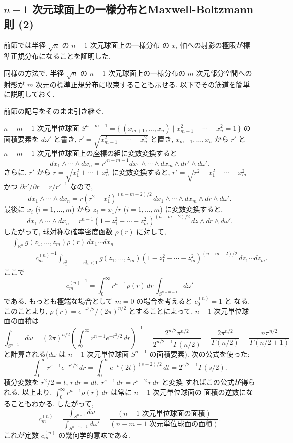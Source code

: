 \documentclass[12pt,twoside]{jarticle}
\newcommand\R{{\mathbb R}} %
\renewcommand\d{\partial}
\theoremstyle{jplain}
\theoremstyle{jplain}
\theoremstyle{jplain}
\numberwithin{theorem}{section}
\numberwithin{equation}{section}
\numberwithin{figure}{section}
\numberwithin{table}{section}
\begin{document}

\subsection{$n-1$ 次元球面上の一様分布とMaxwell-Boltzmann則 (2)}
\label{sec:MB2}

前節では半径 $\sqrt{n}$ の $n-1$ 次元球面上の一様分布
の $x_i$ 軸への射影の極限が標準正規分布になることを証明した.

同様の方法で, 
半径 $\sqrt{n}$ の $n-1$ 次元球面上の一様分布の
$m$ 次元部分空間への射影が $m$ 次元の標準正規分布に収束することも示せる.
以下でその筋道を簡単に説明しておく.

前節の記号をそのまま引き継ぐ.

$n-m-1$ 次元単位球面 $S^{n-m-1}=\{\,(x_{m+1},\ldots,x_n)\mid x_{m+1}^2+\cdots+x_n^2=1\,\}$ 
の面積要素を $d\omega'$ と書き, 
$r'=\sqrt{x_{m+1}^2+\cdots+x_n^2}$ と置き, 
$x_{m+1},\ldots,x_n$ から $r'$ と $n-m-1$ 次元単位球面上の座標の組に変数変換すると
\[
dx_1\wedge\cdots\wedge dx_n
=r'^{n-m-1}dx_1\wedge\cdots\wedge dx_m\wedge dr'\wedge d\omega'.
\]
さらに, $r'$ から $r=\sqrt{x_1^2+\cdots+x_n^2}$ に変数変換すると, 
$r'=\sqrt{r^2-x_1^2-\cdots-x_m^2}$ かつ $\d r'/\d r=r/r'^{-1}$ なので, 
\[
dx_1\wedge\cdots\wedge dx_n
=r(r^2-x_1^2)^{(n-m-2)/2}\,dx_1\wedge\cdots\wedge dx_m\wedge dr\wedge d\omega'.
\]
最後に $x_i$ ($i=1,\ldots,m$) から $z_i=x_1/r$ ($i=1,\ldots,m$) に変数変換すると, 
\[
dx_1\wedge\cdots\wedge dx_n
=r^{n-1}(1-z_1^2-\cdots-z_m^2)^{(n-m-2)/2}\,dz\wedge dr\wedge d\omega'.
\]
したがって, 球対称な確率密度函数 $\rho(r)$ に対して, 
\begin{align*}
&
\int_{\R^n} g(z_1,\ldots,z_m)\rho(r)\,dx_1\cdots dx_n
\\ & \qquad
={c^{(n)}_{m}}^{-1}
\int_{z_1^2+\cdots+z_m^2<1} 
g(z_1,\ldots,z_m)(1-z_1^2-\cdots-z_m^2)^{(n-m-2)/2}\,dz_1\cdots dz_m.
\tag{$*$}
\end{align*}
ここで
\[
{c^{(n)}_m}^{-1}
=
\int_0^\infty r^{n-1}\rho(r)\,dr\,
\int_{S^{n-m-1}}d\omega'
\]
である. もっとも極端な場合として $m=0$ の場合を考えると $c^{(n)}_0=1$ と
なる. このことより, $\rho(r)=e^{-r^2/2}/(2\pi)^{n/2}$ とすることによって, 
$n-1$ 次元単位球面の面積は
\[
\int_{S^{n-1}}d\omega
=(2\pi)^{n/2}\left(\int_0^\infty r^{n-1} e^{-r^2/2}\,dr \right)^{-1}
=\frac{2^{n/2}\pi^{n/2}}{2^{n/2-1}\Gamma(n/2)}
=\frac{2\pi^{n/2}}{\Gamma(n/2)}
=\frac{n\pi^{n/2}}{\Gamma(n/2+1)}
\]
と計算される($d\omega$ は $n-1$ 次元単位球面 $S^{n-1}$ の面積要素). 
次の公式を使った:
\[
\int_0^\infty r^{s-1}e^{-r^2/2}\,dr
=\int_0^\infty e^{-t}(2t)^{(s-2)/2}\,dt
=2^{s/2-1}\Gamma(s/2).
\]
積分変数を $r^2/2=t$, $r\,dr=dt$, $r^{s-1}\,dr=r^{s-2}\,r\,dr$ と変換
すればこの公式が得られる.
以上より, $\int_0^\infty r^{n-1}\rho(r)\,dr$ は常に $n-1$ 次元単位球面の
面積の逆数になることもわかる. したがって, 
\[
c^{(n)}_m
=\frac{\int_{S^{n-1}}d\omega}{\int_{S^{n-m-1}}d\omega'}
=\frac{(\text{$n-1$ 次元単位球面の面積})}{(\text{$n-m-1$ 次元単位球面の面積})}.
\]
これが定数 $c^{(n)}_m$ の幾何学的意味である.
\end{document}
